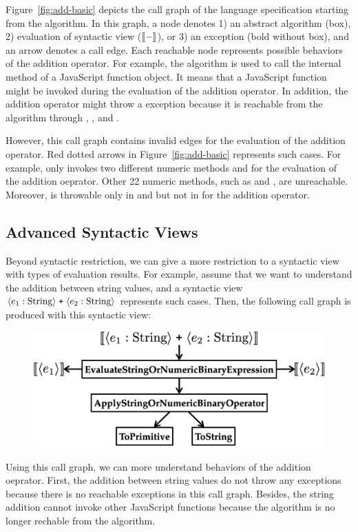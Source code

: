 Figure~\ref{fig:add-basic} depicts the call graph of the language specification
starting from the  algorithm.  In this graph, a node denotes
1) an abstract algorithm (box), 2) evaluation of syntactic view ($\llbracket{-}\rrbracket$), or
3) an exception (bold without box), and an arrow denotes a call edge. Each
reachable node represents possible behaviors of the addition operator.  For
example, the  algorithm is used to call the \eswrd{[[Call]]}
internal method of a JavaScript function object.  It means that a JavaScript
function might be invoked during the evaluation of the addition operator.  In
addition, the addition operator might throw a  exception
because it is reachable from the  algorithm through
, , and .

However, this call graph contains invalid edges for the evaluation of the
addition operator.  Red dotted arrows in Figure~\ref{fig:add-basic} represents
such cases.  For example,  only
invokes two different numeric methods  and
 for the evaluation of the addition oeprator.  Other 22
numeric methods, such as  and ,
are unreachable.  Moreover,  is throwable only in
 and  but not in  for the
addition operator.


\subsection{Advanced Syntactic Views}\label{sec:adv-syn-view}

Beyond syntactic restriction, we can give a more restriction to a syntactic view
with types of evaluation results.  For example, assume that we want to
understand the addition between string values, and a syntactic view
$\langle e_1: \text{String} \rangle \; \texttt{+} \; \langle e_2: \text{String} \rangle$
represents such cases.  Then, the following call graph is produced with this
syntactic view:
\begin{figure}[H]
  \centering
  \includegraphics[width=.8\columnwidth]{img/add-str.png}
\end{figure} \noindent
Using this call graph, we can more understand behaviors of the addition
oeprator.  First, the addition between string values do not throw any exceptions
because there is no reachable exceptions in this call graph.  Besides, the
string addition cannot invoke other JavaScript functions because the
 algorithm is no longer rechable from the 
algorithm.

